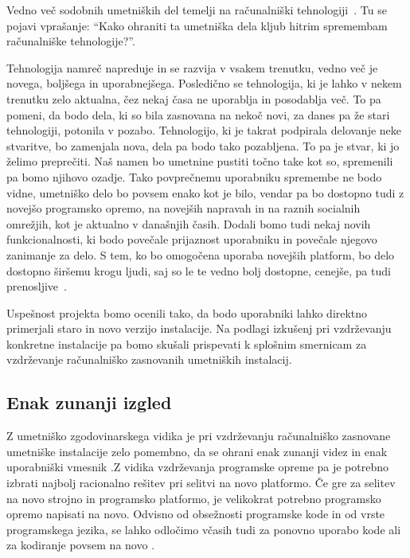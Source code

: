 \renewcommand{\thesubsection}{\arabic{subsection}}

Vedno več sodobnih umetniških del temelji na računalniški tehnologiji~\cite{digitalartconservation}. Tu se pojavi vprašanje: ``Kako ohraniti ta umetniška dela kljub hitrim spremembam računalniške tehnologije?''.

Tehnologija namreč napreduje in se razvija v vsakem trenutku, vedno več je novega, boljšega in uporabnejšega. Posledično se tehnologija, ki je lahko v nekem trenutku zelo aktualna, čez nekaj časa ne uporablja in posodablja več. To pa pomeni, da bodo dela, ki so bila zasnovana na nekoč novi, za danes pa že stari tehnologiji, potonila v pozabo. Tehnologijo, ki je takrat podpirala delovanje neke stvaritve, bo zamenjala nova, dela pa bodo tako pozabljena. To pa je stvar, ki jo želimo preprečiti. Naš namen bo umetnine pustiti točno take kot so, spremenili pa bomo njihovo ozadje. Tako povprečnemu uporabniku spremembe ne bodo vidne, umetniško delo bo povsem enako kot je bilo, vendar pa bo dostopno tudi z novejšo programsko opremo, na novejših napravah in na raznih socialnih omrežjih, kot je aktualno v današnjih časih. Dodali bomo tudi nekaj novih funkcionalnosti, ki bodo povečale prijaznost uporabniku in povečale njegovo zanimanje za delo. S tem, ko bo omogočena uporaba novejših platform, bo delo dostopno širšemu krogu ljudi, saj so le te vedno bolj dostopne, cenejše, pa tudi prenosljive~\cite{vzdrzevanjeProgramskeOpreme}.

Uspešnost projekta bomo ocenili tako, da bodo uporabniki lahko direktno primerjali staro in novo verzijo instalacije. Na podlagi izkušenj pri vzdrževanju konkretne instalacije pa bomo skušali prispevati k splošnim smernicam za vzdrževanje računalniško zasnovanih umetniških instalacij.


\subsection{Enak zunanji izgled}

Z umetniško zgodovinarskega vidika je pri vzdrževanju računalniško zasnovane umetniške instalacije zelo pomembno, da se ohrani enak zunanji videz in enak uporabniški vmesnik \cite{digitalartconservation} .Z vidika vzdrževanja programske opreme pa je potrebno izbrati najbolj racionalno rešitev pri selitvi na novo platformo. Če gre za selitev na novo strojno in programsko platformo, je velikokrat potrebno programsko opremo napisati na novo. Odvisno od obsežnosti programske kode in od vrste programskega jezika, se lahko odločimo včasih tudi za ponovno uporabo kode ali za kodiranje povsem na novo \cite{vzdrzevanjeProgramskeOpreme}.

